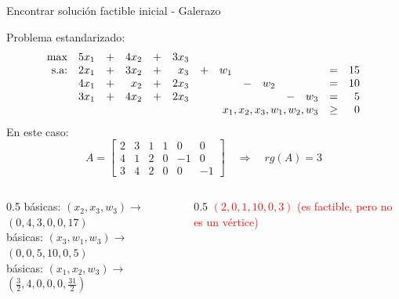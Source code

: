 \documentclass[10pt, aspectratio=169]{beamer}
\begin{document}
    \begin{frame}{Encontrar solución factible inicial - Galerazo}

        Problema estandarizado:
        \[
            \begin{array}{rrrrrrrrrrrrrr}
                \max & 5x_1 & + & 4x_2 & + & 3x_3 & \\
                \text{s.a:} & 2x_1 & + & 3x_2 & + & x_3  & + & w_1 &   &     &   &     & = & 15 \\
                & 4x_1 & + & x_2  & + & 2x_3 &   &     & - & w_2 &   &     & = & 10 \\
                & 3x_1 & + & 4x_2 & + & 2x_3 &   &     &   &     & - & w_3 & = & 5  \\
                & \multicolumn{11}{r}{x_1,x_2,x_3,w_1,w_2,w_3} & \geq & 0 \\
            \end{array}
        \]
        En este caso:
        \[ A= \left[ {\begin{array}{cccccc}
                          2 & 3 & 1 & 1 & 0  & 0  \\
                          4 & 1 & 2 & 0 & -1 & 0  \\
                          3 & 4 & 2 & 0 & 0  & -1
        \end{array} } \right]  \quad \Rightarrow \quad rg(A)=3  \]
        \begin{columns}
            \begin{column}{0.5\linewidth}
                básicas: $(x_2,x_3,w_3)\rightarrow$\textcolor{goodgreen}{$(0, 4, 3, 0, 0, 17)$ } \\
                básicas: $(x_3, w_1, w_3)\rightarrow$\textcolor{goodgreen}{$(0,0,5,10,0, 5)$ }\\
                básicas: $(x_1, x_2, w_3)\rightarrow$
                \textcolor{goodgreen}{$(\frac{3}{2},4,0,0,0, \frac{31}{2})$ }\\
            \end{column}
            \begin{column}{0.5\textwidth}
                \textcolor{red}{$(2,0,1,10,0,3)$  (es factible, pero no es un vértice)}
            \end{column}
        \end{columns}
    \end{frame}
\end{document}
